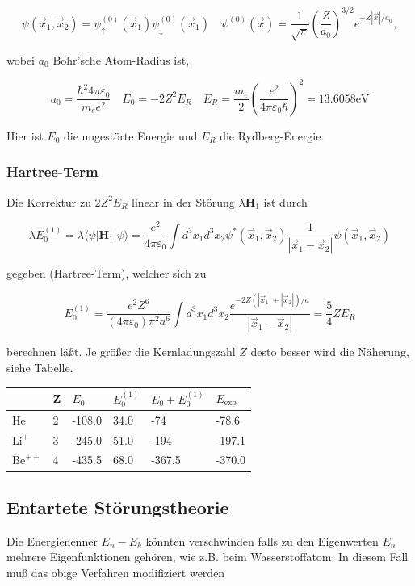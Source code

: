 \documentclass[10pt, letterpaper]{article}
\begin{document}
$$
\psi\left(\vec{x}_{1}, \vec{x}_{2}\right)=\psi_{\uparrow}^{(0)}\left(\vec{x}_{1}\right) \psi_{\downarrow}^{(0)}\left(\vec{x}_{1}\right) \quad \psi^{(0)}(\vec{x})=\frac{1}{\sqrt{\pi}}\left(\frac{Z}{a_{0}}\right)^{3 / 2} e^{-Z|\vec{x}| / a_{0}},
$$

wobei $a_{0}$ Bohr'sche Atom-Radius ist,

$$
a_{0}=\frac{\hbar^{2} 4 \pi \varepsilon_{0}}{m_{e} e^{2}} \quad E_{0}=-2 Z^{2} E_{R} \quad E_{R}=\frac{m_{e}}{2}\left(\frac{e^{2}}{4 \pi \varepsilon_{0} \hbar}\right)^{2}=13.6058 \mathrm{eV}
$$

Hier ist $E_{0}$ die ungestörte Energie und $E_{R}$ die Rydberg-Energie.

\subsubsection*{Hartree-Term}
Die Korrektur zu $2 Z^{2} E_{R}$ linear in der Störung $\lambda \mathbf{H}_{1}$ ist durch

$$
\lambda E_{0}^{(1)}=\lambda\langle\psi| \mathbf{H}_{1}|\psi\rangle=\frac{e^{2}}{4 \pi \varepsilon_{0}} \int d^{3} x_{1} d^{3} x_{2} \psi^{*}\left(\vec{x}_{1}, \vec{x}_{2}\right) \frac{1}{\left|\vec{x}_{1}-\vec{x}_{2}\right|} \psi\left(\vec{x}_{1}, \vec{x}_{2}\right)
$$

gegeben (Hartree-Term), welcher sich zu

$$
E_{0}^{(1)}=\frac{e^{2} Z^{6}}{\left(4 \pi \varepsilon_{0}\right) \pi^{2} a^{6}} \int d^{3} x_{1} d^{3} x_{2} \frac{e^{-2 Z\left(\left|\vec{x}_{1}\right|+\left|\vec{x}_{2}\right|\right) / a}}{\left|\vec{x}_{1}-\vec{x}_{2}\right|}=\frac{5}{4} Z E_{R}
$$

berechnen läßt. Je größer die Kernladungszahl $Z$ desto besser wird die Näherung, siehe Tabelle.

\begin{center}
\begin{tabular}{|l|l|l|l|l|l|}
\hline
 & Z & $E_{0}$ & $E_{0}^{(1)}$ & $E_{0}+E_{0}^{(1)}$ & $E_{\text {exp }}$ \\
\hline
He & 2 & -108.0 & 34.0 & -74 & -78.6 \\
$\mathrm{Li}^{+}$ & 3 & -245.0 & 51.0 & -194 & -197.1 \\
$\mathrm{Be}^{++}$ & 4 & -435.5 & 68.0 & -367.5 & -370.0 \\
\hline
\end{tabular}
\end{center}

\subsection*{Entartete Störungstheorie}
Die Energienenner $E_{n}-E_{k}$ könnten verschwinden falls zu den Eigenwerten $E_{n}$ mehrere Eigenfunktionen gehören, wie z.B. beim Wasserstoffatom. In diesem Fall muß das obige Verfahren modifiziert werden
\end{document}
